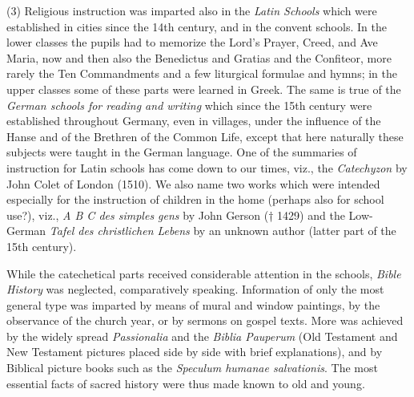 (3) Religious instruction was imparted also in the \emph{Latin Schools} which were established in cities since the 14th century, and in the convent schools. In the lower classes the pupils had to memorize the Lord’s Prayer, Creed, and Ave Maria, now and then also the Benedictus and Gratias and the Confiteor, more rarely the Ten Commandments and a few liturgical formulae and hymns; in the upper classes some of these parts were learned in Greek. The same is true of the \emph{German schools for reading and writing} which since the 15th century were established throughout Germany, even in villages, under the influence of the Hanse and of the Brethren of the Common Life, except that here naturally these subjects were taught in the German language. One of the summaries of instruction for Latin schools has come down to our times, viz., the \emph{Catechyzon} by John Colet of London (1510). We also name two works which were intended especially for the instruction of children in the home (perhaps also for school use?), viz., \emph{A B C des simples gens} by John Gerson († 1429) and the Low-German \emph{Tafel des christlichen Lebens} by an unknown author (latter part of the 15th century).

While the catechetical parts received considerable attention in the schools, \emph{Bible History} was neglected, comparatively speaking. Information of only the most general type was imparted by means of mural and window paintings, by the observance of the church year, or by sermons on gospel texts. More was achieved by the widely spread \emph{Passionalia} and the \emph{Biblia Pauperum} (Old Testament and New Testament pictures placed side by side with brief explanations), and by Biblical picture books such as the \emph{Speculum humanae salvationis}. The most essential facts of sacred history were thus made known to old and young.

